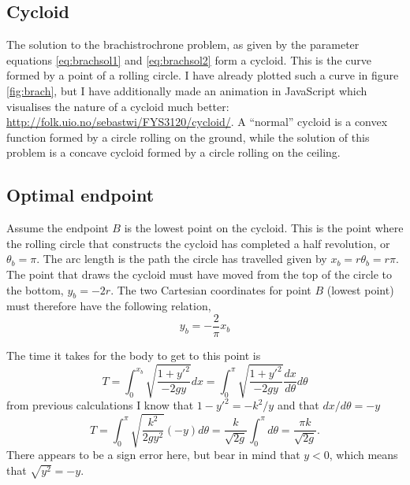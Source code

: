 \documentclass[11pt]{amsart}
\begin{document}
\subsection{Cycloid}
The solution to the brachistrochrone problem, as given by the parameter equations \ref{eq:brachsol1} and \ref{eq:brachsol2} form a cycloid. This is the curve formed by a point of a rolling circle. I have already plotted such a curve in figure \ref{fig:brach}, but I have additionally made an animation in JavaScript which visualises the nature of a cycloid much better: \url{http://folk.uio.no/sebastwi/FYS3120/cycloid/}. A ``normal'' cycloid is a convex function formed by a circle rolling on the ground, while the solution of this problem is a concave cycloid formed by a circle rolling on the ceiling. 

\subsection{Optimal endpoint}
Assume the endpoint $B$ is the lowest point on the cycloid. This is the point where the rolling circle that constructs the cycloid has completed a half revolution, or $\theta_b = \pi$. The arc length is the path the circle has travelled given by $x_b = r\theta_b = r\pi$. The point that draws the cycloid must have moved from the top of the circle to the bottom, $y_b = -2r$. The two Cartesian coordinates for point $B$ (lowest point) must therefore have the following relation,
\begin{equation}
y_b = -\frac{2}{\pi}x_b
\end{equation}

The time it takes for the body to get to this point is
\begin{equation*}
T = \int_0^{x_b}\sqrt{\frac{1+y'^2}{-2gy}}dx = \int_0^{\pi}\sqrt{\frac{1+y'^2}{-2gy}}\frac{dx}{d\theta}d\theta
\end{equation*}
from previous calculations I know that $1-y'^2 = -k^2/y$ and that $dx/d\theta= -y$ 
\begin{equation}
\label{eq:cycloidperiod}
T = \int_0^\pi\sqrt{\frac{k^2}{2gy^2}}(-y)d\theta = \frac{k}{\sqrt{2g}}\int_0^\pi d\theta = \frac{\pi k}{\sqrt{2g}}.
\end{equation}
There appears to be a sign error here, but bear in mind that $y<0$, which means that $\sqrt{y^2}=-y$.
\end{document}
